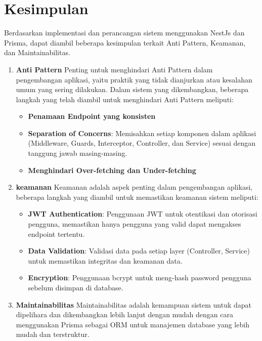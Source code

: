 \section{Kesimpulan}

Berdasarkan implementasi dan perancangan sistem menggunakan NestJs dan Prisma, dapat diambil beberapa kesimpulan terkait Anti Pattern, Keamanan, dan Maintainabilitas.
\begin{enumerate}
  \item \textbf{Anti Pattern}\newline
  Penting untuk menghindari Anti Pattern dalam pengembangan aplikasi, yaitu praktik yang tidak dianjurkan atau kesalahan umum yang sering dilakukan. Dalam sistem yang dikembangkan, beberapa langkah yang telah diambil untuk menghindari Anti Pattern meliputi:
  \begin{itemize}
    \item \textbf{Penamaan Endpoint yang konsisten}
    \item \textbf{Separation of Concerns}: Memisahkan setiap komponen dalam aplikasi (Middleware, Guards, Interceptor, Controller, dan Service) sesuai dengan tanggung jawab masing-masing.
    \item \textbf{Menghindari Over-fetching dan Under-fetching}
  \end{itemize}
  \item \textbf{keamanan}\newline
  Keamanan adalah aspek penting dalam pengembangan aplikasi, beberapa langkah yang diambil untuk memastikan keamanan sistem meliputi:
  \begin{itemize}
    \item \textbf{JWT Authentication}: Penggunaan JWT untuk otentikasi dan otorisasi pengguna, memastikan hanya pengguna yang valid dapat mengakses endpoint tertentu.
    \item \textbf{Data Validation}: Validasi data pada setiap layer (Controller, Service) untuk memastikan integritas dan keamanan data.
    \item \textbf{Encryption}: Penggunaan bcrypt untuk meng-hash password pengguna sebelum disimpan di database.
  \end{itemize}
  \item \textbf{Maintainabilitas}\newline
  Maintainabilitas adalah kemampuan sistem untuk dapat dipelihara dan dikembangkan lebih lanjut dengan mudah dengan cara menggunakan Prisma sebagai ORM untuk manajemen database yang lebih mudah dan terstruktur.
\end{enumerate}

